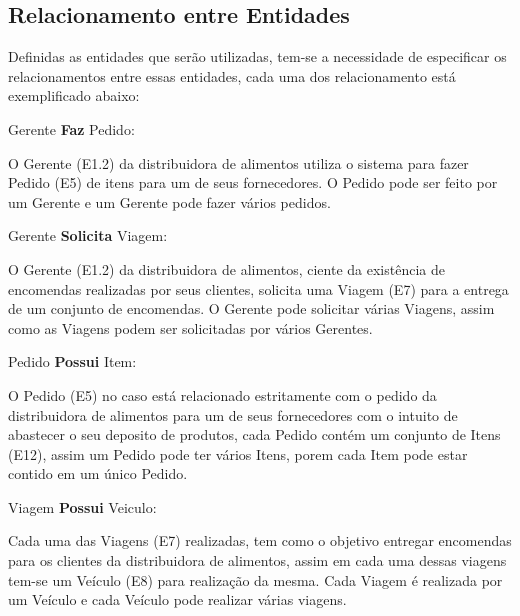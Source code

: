 \documentclass[12pt, onecolumn, titlepage]{article}
\begin{document}
\subsection{Relacionamento entre Entidades}
\label{sect:relacionamento}

Definidas as entidades que serão utilizadas, tem-se a necessidade de especificar os relacionamentos entre essas entidades, cada uma dos relacionamento está exemplificado abaixo:

\begin{description}

\item Gerente \textbf{Faz} Pedido: 
\item \qquad O Gerente (E1.2) da distribuidora de alimentos utiliza o sistema para fazer Pedido (E5) de itens para um de seus fornecedores. O Pedido pode ser feito por um Gerente e um Gerente pode fazer vários pedidos.


\item Gerente \textbf{Solicita} Viagem: 
\item \qquad O Gerente (E1.2) da distribuidora de alimentos, ciente da existência de encomendas realizadas por seus clientes, solicita uma Viagem (E7) para a entrega de um conjunto de encomendas. O Gerente pode solicitar várias Viagens, assim como as Viagens podem ser solicitadas por vários Gerentes.

\item Pedido \textbf{Possui} Item: 
\item \qquad O Pedido (E5) no caso está relacionado estritamente com o pedido da distribuidora de alimentos para um de seus fornecedores com o intuito de abastecer o seu deposito de produtos, cada Pedido contém um conjunto de Itens (E12), assim um Pedido pode ter vários Itens, porem cada Item pode estar contido em um único Pedido.

\item Viagem \textbf{Possui} Veiculo: 
\item \qquad Cada uma das Viagens (E7) realizadas, tem como o objetivo entregar encomendas para os clientes da distribuidora de alimentos, assim em cada uma dessas viagens tem-se um Veículo (E8) para realização da mesma. Cada Viagem é realizada por um Veículo e cada Veículo pode realizar várias viagens.


\end{description}
\end{document}
